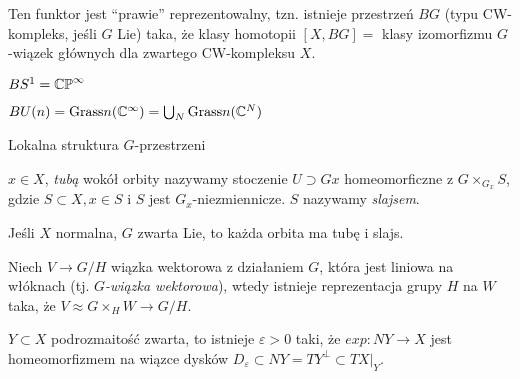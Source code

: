  \begin{twierdzeniebd}
  Ten funktor jest ``prawie'' reprezentowalny, tzn. istnieje przestrzeń $BG$ (typu CW-kompleks, jeśli $G$ Lie) taka, że klasy homotopii $[X,BG] = $ klasy izomorfizmu $G$-wiązek głównych dla zwartego CW-kompleksu $X$.
 \end{twierdzeniebd}
 
 \begin{przyklad}
  $BS^1 = \mb{CP}^\infty$
  
  $BU(n) = \Grass_n(\mb{C}^\infty) = \bigcup_N \Grass_n(\mb{C}^N)$
 \end{przyklad}
 
 Lokalna struktura $G$-przestrzeni
 
 \begin{definicja}
  $x \in X$, \emph{tubą} wokół orbity nazywamy stoczenie $U \supset Gx$ homeomorficzne z $G \times_{G_x} S$, gdzie $S \subset X, x \in S$ i $S$ jest $G_x$-niezmiennicze. $S$ nazywamy \emph{slajsem}.
 \end{definicja}
 
 \begin{twierdzenie}
  Jeśli $X$ normalna, $G$ zwarta Lie, to każda orbita ma tubę i slajs.
 \end{twierdzenie}
 
 \begin{lemat}
  Niech $V \to G/H$ wiązka wektorowa z działaniem $G$, która jest liniowa na włóknach (tj. \emph{$G$-wiązka wektorowa}), wtedy istnieje reprezentacja grupy $H$ na $W$ taka, że $V \approx G \times_H W \to G/H$.
 \end{lemat}
 
 \begin{twierdzeniebd}
  $Y \subset X$ podrozmaitość zwarta, to istnieje $\varepsilon>0$ taki, że $exp: NY \to X$ jest homeomorfizmem na wiązce dysków $D_\varepsilon \subset NY=TY^\perp \subset TX|_Y$.
 \end{twierdzeniebd}


























 
 
 
 
 
